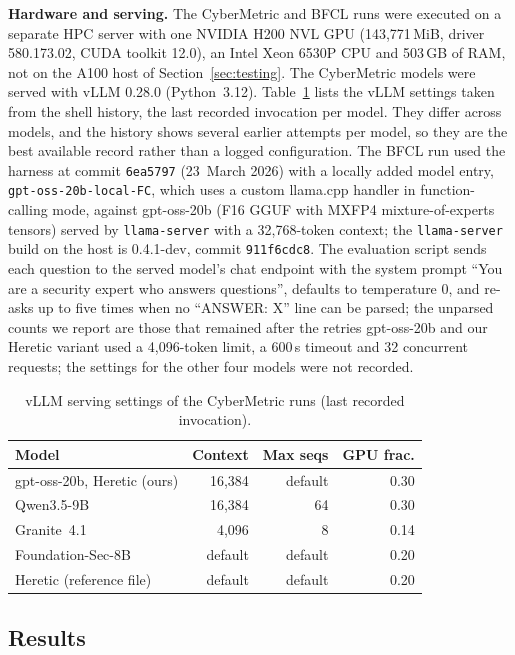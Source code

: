 \documentclass[conference]{IEEEtran}
\begin{document}
\textbf{Hardware and serving.} The CyberMetric and BFCL runs were executed on
a separate HPC server with one NVIDIA H200 NVL GPU (143{,}771\,MiB, driver
580.173.02, CUDA toolkit 12.0), an Intel Xeon 6530P CPU and 503\,GB of RAM, not
on the A100 host of Section~\ref{sec:testing}. The CyberMetric models were
served with vLLM 0.28.0 (Python~3.12). Table~\ref{tab:serving} lists the vLLM settings taken from the shell history, the
last recorded invocation per model. They differ across models, and the history
shows several earlier attempts per model, so they are the best available record
rather than a logged configuration. The BFCL run used the
harness at commit \texttt{6ea5797} (23~March 2026) with a locally added model
entry, \texttt{gpt-oss-20b-local-FC}, which uses a custom llama.cpp handler in
function-calling mode, against gpt-oss-20b (F16 GGUF with MXFP4
mixture-of-experts tensors) served by \texttt{llama-server} with a
32{,}768-token context; the \texttt{llama-server} build on the host is
0.4.1-dev, commit \texttt{911f6cdc8}.
The evaluation script sends each question to the served model's chat endpoint
with the system prompt ``You are a security expert who answers questions'',
defaults to temperature 0, and re-asks up to five times when no
``ANSWER: X'' line can be parsed; the unparsed counts we report are those that
remained after the retries
gpt-oss-20b and our Heretic variant used a 4{,}096-token limit, a 600\,s timeout
and 32 concurrent requests; the settings for the other four models were not recorded.

\begin{table}[t]
\caption{vLLM serving settings of the CyberMetric runs (last recorded invocation).}
\label{tab:serving}
\centering
\small
\begin{tabular}{@{}lrrr@{}}
\toprule
\textbf{Model} & \textbf{Context} & \textbf{Max seqs} & \textbf{GPU frac.} \\
\midrule
gpt-oss-20b, Heretic (ours) & 16{,}384 & default & 0.30 \\
Qwen3.5-9B & 16{,}384 & 64 & 0.30 \\
Granite~4.1 & 4{,}096 & 8 & 0.14 \\
Foundation-Sec-8B & default & default & 0.20 \\
Heretic (reference file) & default & default & 0.20 \\
\bottomrule
\end{tabular}
\end{table}

\subsection{Results}
\end{document}
